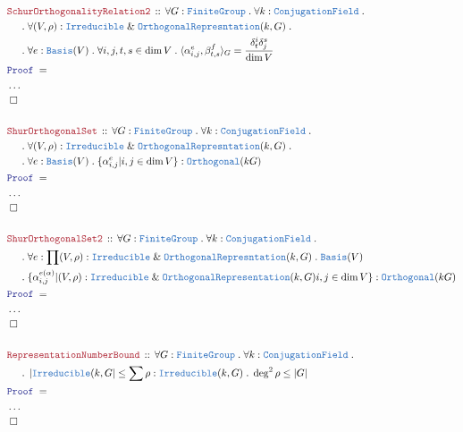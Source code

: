 \documentclass[12pt]{scrartcl}%
\newcommand{\TYPE}[1]{\textcolor{NavyBlue}{\mathtt{#1}}}%
\newcommand{\LOGIC}[1]{\textcolor{Blue}{\mathtt{#1}}}%
\newcommand{\THM}[1]{\textcolor{Maroon}{\mathtt{#1}}}%
\renewcommand{\.}{\; . \;} %
\newcommand{\Theorem}[2]{& \THM{#1} \, :: \, #2 \\ & \Proof = \\ } %
\newcommand{\NewLine}{\\ & \kern 1pc}%
\newcommand{\Page}[1]{ \begin{align*} #1 \end{align*}  }%
\newcommand{\NoProof}{ & \ldots \\ \EndProof}%
\renewcommand{\And}{\; \& \;}%
\newcommand{\QED}{\; \square} %
\newcommand{\EndProof}{& \QED \\} %
\newcommand{\Proof}{\LOGIC{Proof} \; } %
\newcommand{\FG}{\TYPE{FiniteGroup}} %
\newcommand{\Basis}{\TYPE{Basis}} %
\begin{document}
\Page{
	\Theorem{SchurOrthogonalityRelation2}
	{
		\forall G : \FG \.
		\forall k : \TYPE{ConjugationField} \. \NewLine \. 
		\forall (V,\rho) : 
		\TYPE{Irreducible} \And \TYPE{OrthogonalRepresntation}
		(k,G) \.
		\NewLine \. 
		\forall e : \Basis(V) \.
		\forall i,j,t,s \in \dim V \.
		\langle \alpha_{i,j}^e, \beta_{t,s}^f \rangle_G = 
		\frac{\delta^i_t \delta_j^s}{\dim V} 
	}
	\NoProof
	\\
	\Theorem{ShurOrthogonalSet}
	{
		\forall G : \FG \.
		\forall k : \TYPE{ConjugationField} \. \NewLine \. 
		\forall (V,\rho) : 
		\TYPE{Irreducible} \And \TYPE{OrthogonalRepresntation}
		(k,G) \.
		\NewLine \.	
		\forall e : \Basis(V) \.
		\{ \alpha_{i,j}^e | i,j \in \dim V \} 
		: \TYPE{Orthogonal}(kG) 
	}
	\NoProof	
	\\
	\Theorem{ShurOrthogonalSet2}
	{
		\forall G : \FG \.
		\forall k : \TYPE{ConjugationField} \. \NewLine \. 
		\forall e : 
		\prod (V,\rho) : 
		\TYPE{Irreducible} \And \TYPE{OrthogonalRepresntation}
		(k,G) \.  \TYPE{Basis}(V)
		\NewLine \.	
		\{ \alpha_{i,j}^{e(\alpha)} | 
		(V,\rho) : \TYPE{Irreducible} \And 
		\TYPE{OrthogonalRepresentation}(k,G)
		i,j \in \dim V \} 
		: \TYPE{Orthogonal}(kG) 
	}
	\NoProof
	\\
	\Theorem{RepresentationNumberBound}
	{
		\forall G : \FG \.
		\forall k : \TYPE{ConjugationField} \. \NewLine \.
		\left| \TYPE{Irreducible}(k,G \right| \le
		\sum  \rho : \TYPE{Irreducible}(k,G) \.
		\deg^2 \rho    \le |G|
	}
	\NoProof	
}
\newpage
\end{document}
